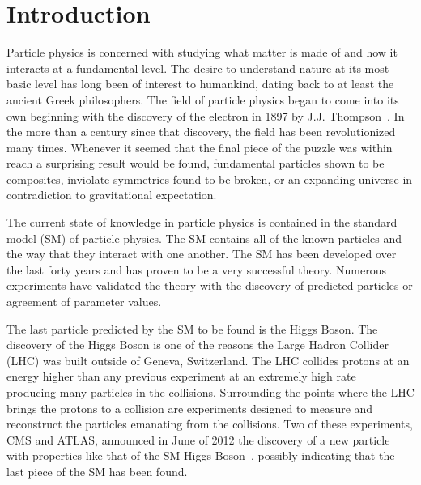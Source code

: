 \chapter{Introduction}

Particle physics is concerned with studying what matter is made of and how it interacts at a fundamental level.
The desire to understand nature at its most basic level has long been of interest to humankind, dating back to at least the ancient Greek philosophers.
The field of particle physics began to come into its own beginning with the discovery of the electron in 1897 by J.J. Thompson~\cite{griffiths2008introduction}.
In the more than a century since that discovery, the field has been revolutionized many times. Whenever it seemed that the final piece of the puzzle was within reach
a surprising result would be found, fundamental particles shown to be composites, inviolate symmetries found to be broken,
or an expanding universe in contradiction to gravitational expectation.

The current state of knowledge in particle physics is contained in the standard model (SM) of particle physics. The SM contains all of the known
particles and the way that they interact with one another. The SM has been developed over the last forty years and has proven to be a very successful theory. 
Numerous experiments have validated the theory with the discovery of predicted particles or agreement of parameter values.

The last particle predicted by the SM to be found is the Higgs Boson.
The discovery of the Higgs Boson is one of the reasons the Large Hadron Collider (LHC) was built outside of Geneva, Switzerland. 
The LHC collides protons at an energy higher than any previous experiment at an extremely high rate~\cite{1748-0221-3-08-S08001}
producing many particles in the collisions.
Surrounding the points where the LHC brings the protons to a collision
are experiments designed to measure and reconstruct the particles emanating from the collisions. Two of these experiments, CMS and
ATLAS, announced in June of 2012 the discovery of a new particle with properties like that of the SM Higgs Boson~\cite{Chatrchyan:2013lba, Aad:2012tfa}, possibly
indicating that the last piece of the SM has been found.

